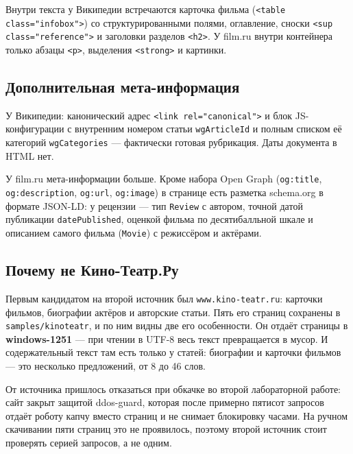 Внутри текста у Википедии встречаются карточка фильма
(\texttt{<table class="infobox">}) со структурированными полями, оглавление, сноски
\texttt{<sup class="reference">} и заголовки разделов \texttt{<h2>}. У film.ru внутри
контейнера только абзацы \texttt{<p>}, выделения \texttt{<strong>} и картинки.

\subsection*{Дополнительная мета-информация}

У Википедии: канонический адрес \texttt{<link rel="canonical">} и блок JS-конфигурации с
внутренним номером статьи \texttt{wgArticleId} и полным списком её категорий
\texttt{wgCategories} --- фактически готовая рубрикация. Даты документа в HTML нет.

У film.ru мета-информации больше. Кроме набора Open Graph (\texttt{og:title},
\texttt{og:description}, \texttt{og:url}, \texttt{og:image}) в странице есть разметка
schema.org в формате JSON-LD: у рецензии --- тип \texttt{Review} с автором, точной датой
публикации \texttt{datePublished}, оценкой фильма по десятибалльной шкале и описанием
самого фильма (\texttt{Movie}) с режиссёром и актёрами.

\subsection*{Почему не Кино-Театр.Ру}

Первым кандидатом на второй источник был \texttt{www.kino-teatr.ru}: карточки фильмов,
биографии актёров и авторские статьи. Пять его страниц сохранены в
\texttt{samples/kinoteatr}, и по ним видны две его особенности. Он отдаёт
страницы в \textbf{windows-1251} --- при чтении в UTF-8 весь текст превращается в мусор. И
содержательный текст там есть только у статей: биографии и карточки фильмов --- это
несколько предложений, от 8 до 46 слов.

От источника пришлось отказаться при обкачке во второй лабораторной работе: сайт закрыт
защитой ddos-guard, которая после примерно пятисот запросов отдаёт роботу капчу вместо
страниц и не снимает блокировку часами. На ручном скачивании пяти страниц это не
проявилось, поэтому второй источник стоит проверять серией запросов, а не одним.

\pagebreak
